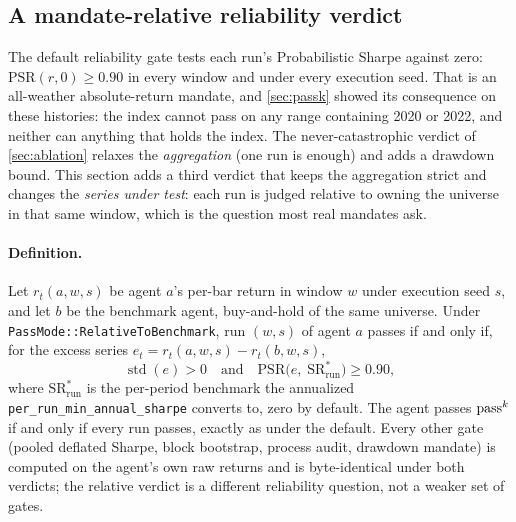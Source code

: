 
\subsection{A mandate-relative reliability verdict}\label{sec:relative}

The default reliability gate tests each run's Probabilistic Sharpe against zero: $\text{PSR}(r, 0) \ge 0.90$ in every window and under every execution seed. That is an all-weather absolute-return mandate, and \cref{sec:passk} showed its consequence on these histories: the index cannot pass on any range containing 2020 or 2022, and neither can anything that holds the index. The never-catastrophic verdict of \cref{sec:ablation} relaxes the \emph{aggregation} (one run is enough) and adds a drawdown bound. This section adds a third verdict that keeps the aggregation strict and changes the \emph{series under test}: each run is judged relative to owning the universe in that same window, which is the question most real mandates ask.

\paragraph{Definition.} Let $r_t(a, w, s)$ be agent $a$'s per-bar return in window $w$ under execution seed $s$, and let $b$ be the benchmark agent, buy-and-hold of the same universe. Under \texttt{PassMode::RelativeToBenchmark}, run $(w, s)$ of agent $a$ passes if and only if, for the excess series $e_t = r_t(a, w, s) - r_t(b, w, s)$,
\begin{equation}
\operatorname{std}(e) > 0 \quad\text{and}\quad \text{PSR}\big(e,\; \text{SR}^{\ast}_{\text{run}}\big) \ge 0.90,
\label{eq:relative}
\end{equation}
where $\text{SR}^{\ast}_{\text{run}}$ is the per-period benchmark the annualized \texttt{per\_run\_min\_annual\_sharpe} converts to, zero by default. The agent passes $\text{pass}^{k}$ if and only if every run passes, exactly as under the default. Every other gate (pooled deflated Sharpe, block bootstrap, process audit, drawdown mandate) is computed on the agent's own raw returns and is byte-identical under both verdicts; the relative verdict is a different reliability question, not a weaker set of gates.

